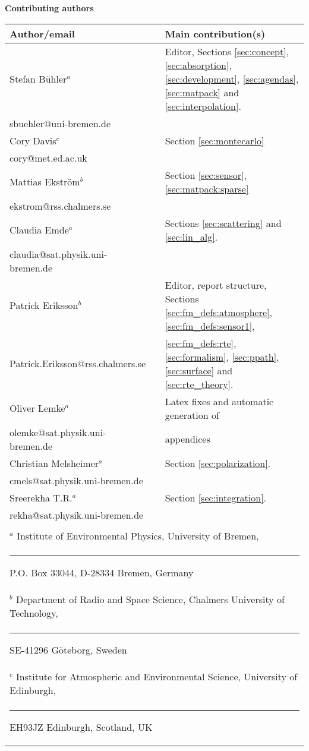 %
\newpage
\thispagestyle{plain}
%
\begin{center}

{\Large \bf Contributing authors}
\vspace*{20mm}

\begin{tabular}{lp{10mm}l}
\hline
{\bf Author/email} & & {\bf Main contribution(s)} \\
\hline
  Stefan B\"uhler$^a$ & & Editor, Sections \ref{sec:concept},  
     \ref{sec:absorption}, \ref{sec:development}, \ref{sec:agendas},
     \ref{sec:matpack} and \ref{sec:interpolation}.\\
  sbuehler@uni-bremen.de & &        \\
\hline
  Cory Davis$^c$ & & Section \ref{sec:montecarlo} \\
  cory@met.ed.ac.uk & & \\
\hline
  Mattias Ekstr\"om$^b$ & & Section \ref{sec:sensor}, \ref{sec:matpack:sparse} \\
  ekstrom@rss.chalmers.se & & \\
\hline
  Claudia Emde$^a$ & & Sections \ref{sec:scattering} and \ref{sec:lin_alg}.\\
  claudia@sat.physik.uni-bremen.de & & \\
\hline
  Patrick Eriksson$^b$ &  & Editor, report structure, 
    Sections \ref{sec:fm_defs:atmosphere}, \ref{sec:fm_defs:sensor1}, \\
  Patrick.Eriksson@rss.chalmers.se & & 
    \ref{sec:fm_defs:rte}, \ref{sec:formalism}, \ref{sec:ppath},
    \ref{sec:surface} and \ref{sec:rte_theory}.\\
\hline
  Oliver Lemke$^a$ & & Latex fixes and automatic generation of\\
  olemke@sat.physik.uni-bremen.de & & appendices\\
\hline
  Christian Melsheimer$^a$ & & Section \ref{sec:polarization}.\\
  cmels@sat.physik.uni-bremen.de & & \\
\hline
  Sreerekha T.R.$^a$ & & Section \ref{sec:integration}.\\
  rekha@sat.physik.uni-bremen.de & & \\
\hline
 && \\
\multicolumn{3}{l}{ $^a$
      Institute of Environmental Physics, University of Bremen, } \\
\multicolumn{3}{l}{\rule{1.5ex}{0pt}P.O. Box 33044, D-28334 Bremen, Germany} \\
\multicolumn{3}{l}{ $^b$
      Department of Radio and Space Science, 
      Chalmers University of Technology,} \\
\multicolumn{3}{l}{\rule{1.5ex}{0pt}SE-41296 G\"oteborg, Sweden} \\
\multicolumn{3}{l}{ $^c$
      Institute for Atmospheric and Environmental Science, 
      University of Edinburgh,} \\
\multicolumn{3}{l}{\rule{1.5ex}{0pt}EH93JZ Edinburgh, Scotland, UK} \\

\end{tabular}
\end{center}
